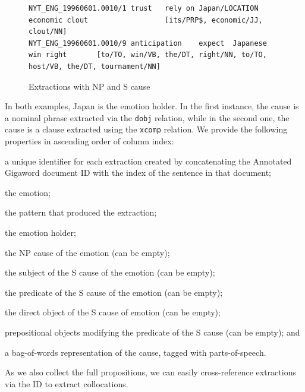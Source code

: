\begin{figure}
\begin{lstlisting}
NYT_ENG_19960601.0010/1	trust	rely on	Japan/LOCATION	economic clout					[its/PRP$, economic/JJ, clout/NN]
NYT_ENG_19960601.0010/9	anticipation	expect	Japanese				win	right		[to/TO, win/VB, the/DT, right/NN, to/TO, host/VB, the/DT, tournament/NN]
\end{lstlisting}
\caption{Extractions with NP and S cause}\label{fig:extractions}
\end{figure}

In both examples, Japan is the emotion holder. In the first instance, the cause is a nominal phrase extracted via the \texttt{dobj} relation, while in the second one, the cause is a clause extracted using the \texttt{xcomp} relation. We provide the following properties in ascending order of column index:

\begin{aenumerate}
	\item a unique identifier for each extraction created by concatenating the Annotated Gigaword document ID with the index of the sentence in that document;
	\item the emotion;
	\item the pattern that produced the extraction;
	\item the emotion holder;
	\item the NP cause of the emotion (can be empty);
	\item the subject of the S cause of the emotion (can be empty);
	\item the predicate of the S cause of the emotion (can be empty);
	\item the direct object of the S cause of emotion (can be empty);
	\item prepositional objects modifying the predicate of the S cause (can be empty); and
	\item a bag-of-words representation of the cause, tagged with parts-of-speech.
\end{aenumerate}

As we also collect the full propositions, we can easily cross-reference extractions via the ID to extract collocations. 